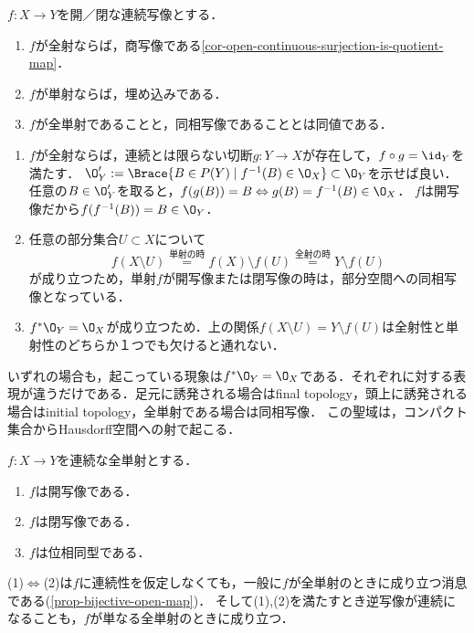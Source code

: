 \documentclass[uplatex,dvipdfmx]{jsreport}
\begin{document}
\begin{theorem}
    $f:X\to Y$を開／閉な連続写像とする．
    \begin{enumerate}
        \item $f$が全射ならば，商写像である\ref{cor-open-continuous-surjection-is-quotient-map}．
        \item $f$が単射ならば，埋め込みである．
        \item $f$が全単射であることと，同相写像であることとは同値である．
    \end{enumerate}
\end{theorem}
\begin{Proof}\mbox{}
    \begin{enumerate}
        \item $f$が全射ならば，連続とは限らない切断$g:Y\to X$が存在して，$f\circ g=\id_Y$を満たす．
        $\O_Y':=\Brace{B\in P(Y)\mid f^{-1}(B)\in\O_X}\subset\O_Y$を示せば良い．
        任意の$B\in\O_Y'$を取ると，$f(g(B))=B\Leftrightarrow g(B)=f^{-1}(B)\in\O_X$．
        $f$は開写像だから$f(f^{-1}(B))=B\in\O_Y$．
        \item 任意の部分集合$U\subset X$について\[f(X\setminus U)\overset{単射の時}{=}f(X)\setminus f(U)\overset{全射の時}{=}Y\setminus f(U)\]
        が成り立つため，単射$f$が開写像または閉写像の時は，部分空間への同相写像となっている．
        \item $f^*\O_Y=\O_X$が成り立つため．上の関係$f(X\setminus U)=Y\setminus f(U)$は全射性と単射性のどちらか１つでも欠けると通れない．
    \end{enumerate}
\end{Proof}
\begin{remarks}
    いずれの場合も，起こっている現象は$f^*\O_Y=\O_X$である．それぞれに対する表現が違うだけである．足元に誘発される場合はfinal topology，頭上に誘発される場合はinitial topology，全単射である場合は同相写像．
    この聖域は，コンパクト集合からHausdorff空間への射で起こる．
\end{remarks}

\begin{corollary}
    $f:X\to Y$を連続な全単射とする．
    \begin{enumerate}
        \item $f$は開写像である．
        \item $f$は閉写像である．
        \item $f$は位相同型である．
    \end{enumerate}
\end{corollary}
\begin{Proof}
    (1)$\Leftrightarrow$(2)は$f$に連続性を仮定しなくても，一般に$f$が全単射のときに成り立つ消息である(\ref{prop-bijective-open-map})．
    そして(1),(2)を満たすとき逆写像が連続になることも，$f$が単なる全単射のときに成り立つ．
\end{Proof}
\end{document}
